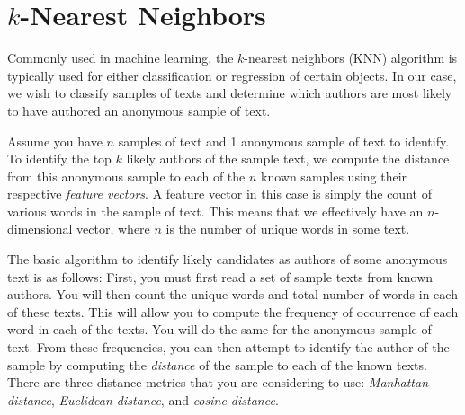 \section{$k$-Nearest Neighbors}

Commonly used in machine learning, the $k$-nearest neighbors (KNN) algorithm is
typically used for either classification or regression of certain objects. In
our case, we wish to classify samples of texts and determine which authors are
most likely to have authored an anonymous sample of text.

Assume you have $n$ samples of text and 1 anonymous sample of text to identify.
To identify the top $k$ likely authors of the sample text, we compute the
distance from this anonymous sample to each of the $n$ known samples using their
respective \emph{feature vectors}. A feature vector in this case is simply the
count of various words in the sample of text. This means that we effectively
have an $n$-dimensional vector, where $n$ is the number of unique words in some
text.

The basic algorithm to identify likely candidates as authors of some anonymous
text is as follows: First, you must first read a set of sample texts from known
authors. You will then count the unique words and total number of words in each
of these texts. This will allow you to compute the frequency of occurrence of
each word in each of the texts. You will do the same for the anonymous sample of
text. From these frequencies, you can then attempt to identify the author of the
sample by computing the \emph{distance} of the sample to each of the known
texts. There are three distance metrics that you are considering to use:
\emph{Manhattan distance}, \emph{Euclidean distance}, and \emph{cosine
distance}.

